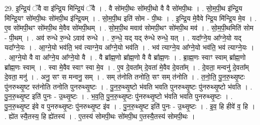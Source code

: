 \documentclass[17pt]{extarticle}
\begin{document}
29. इ॒न्द्रि॒यं ॅवै वा इ॑न्द्रि॒य मि॑न्द्रि॒यं ॅवै । . वै सो॑मपी॒थः सो॑मपी॒थो वै वै सो॑मपी॒थः । . सो॒म॒पी॒थ इ॑न्द्रि॒य मि॑न्द्रि॒यꣳ सो॑मपी॒थः सो॑मपी॒थ इ॑न्द्रि॒यम् । . सो॒म॒पी॒थ इति॑ सोम - पी॒थः । . इ॒न्द्रि॒य मे॒वैवे न्द्रि॒य मि॑न्द्रि॒य मे॒व । . ए॒व सो॑मपी॒थꣳ सो॑मपी॒थ मे॒वैव सो॑मपी॒थम् । . सो॒म॒पी॒थ मवाव॑ सोमपी॒थꣳ सो॑मपी॒थ मव॑ । . सो॒म॒पी॒थमिति॑ सोम - पी॒थम् । . अव॑ रुन्धे रु॒न्धे ऽवाव॑ रुन्धे । . रु॒न्धे॒ यद् यद् रु॑न्धे रुन्धे॒ यत् । . यदा᳚ग्ने॒य आ᳚ग्ने॒यो यद् यदा᳚ग्ने॒यः । . आ॒ग्ने॒यो भव॑ति॒ भव॑ त्याग्ने॒य आ᳚ग्ने॒यो भव॑ति । . भव॑ त्याग्ने॒य आ᳚ग्ने॒यो भव॑ति॒ भव॑ त्याग्ने॒यः । . आ॒ग्ने॒यो वै वा आ᳚ग्ने॒य आ᳚ग्ने॒यो वै । . वै ब्रा᳚ह्म॒णो ब्रा᳚ह्म॒णो वै वै ब्रा᳚ह्म॒णः । . ब्रा॒ह्म॒णः स्वाꣳ स्वाम् ब्रा᳚ह्म॒णो ब्रा᳚ह्म॒णः स्वाम् । . स्वा मे॒वैव स्वाꣳ स्वा मे॒व । . ए॒व दे॒वता᳚म् दे॒वता॑ मे॒वैव दे॒वता᳚म् । . दे॒वता॒ मन्वनु॑ दे॒वता᳚म् दे॒वता॒ मनु॑ । . अनु॒ सꣳ स मन्वनु॒ सम् । . सम् त॑नोति तनोति॒ सꣳ सम् त॑नोति । . त॒नो॒ति॒ पु॒न॒रु॒थ्सृ॒ष्टः पु॑नरुथ्सृ॒ष्ट स्त॑नोति तनोति पुनरुथ्सृ॒ष्टः । . पु॒न॒रु॒थ्सृ॒ष्टो भ॑वति भवति पुनरुथ्सृ॒ष्टः पु॑नरुथ्सृ॒ष्टो भ॑वति । . पु॒न॒रु॒थ्सृ॒ष्ट इति॑ पुनः - उ॒थ्सृ॒ष्टः । . भ॒व॒ति॒ पु॒न॒रु॒थ्सृ॒ष्टः पु॑नरुथ्सृ॒ष्टो भ॑वति भवति पुनरुथ्सृ॒ष्टः । . पु॒न॒रु॒थ्सृ॒ष्ट इ॑वे व पुनरुथ्सृ॒ष्टः पु॑नरुथ्सृ॒ष्ट इ॑व । . पु॒न॒रु॒थ्सृ॒ष्ट इति॑ पुनः - उ॒थ्सृ॒ष्टः । . इ॒व॒ हि हीवे॑ व॒ हि । . ह्ये॑त स्यै॒तस्य॒ हि ह्ये॑तस्य॑ । . ए॒तस्य॑ सोमपी॒थः सो॑मपी॒थ ए॒तस्यै॒तस्य॑ सोमपी॒थः । \newline
\end{document}
